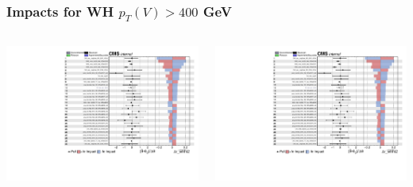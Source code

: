 \documentclass{beamer}
\begin{document}
\begin{frame}
  \frametitle{Impacts for WH $p_T(V) > 400$ GeV}
  \centering
  \begin{columns}
    \begin{column}{0.5\linewidth}
      \includegraphics[width=0.85\linewidth,page=1]{figures/impacts/impacts_r_whhi2.pdf}
    \end{column}
    \begin{column}{0.5\linewidth}
      \includegraphics[width=0.85\linewidth,page=2]{figures/impacts/impacts_r_whhi2.pdf}
    \end{column}
  \end{columns}
\end{frame}
\end{document}
